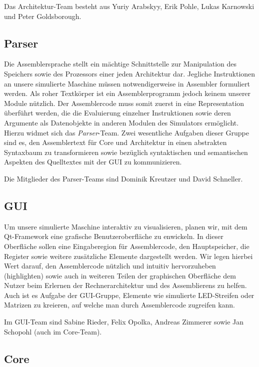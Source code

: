 Das Architektur-Team besteht aus Yuriy Arabskyy, Erik Pohle, Lukas Karnowski und
Peter Goldsborough.

\subsection{Parser}

Die Assemblersprache stellt ein mächtige Schnittstelle zur Manipulation des
Speichers sowie des Prozessors einer jeden Architektur dar. Jegliche
Instruktionen an unsere simulierte Maschine müssen notwendigerweise in Assembler
formuliert werden. Als roher Textkörper ist ein Assemblerprogramm jedoch keinem
unserer Module nützlich. Der Assemblercode muss somit zuerst in eine
Representation überführt werden, die die Evaluierung einzelner Instruktionen
sowie deren Argumente als Datenobjekte in anderen Modulen des Simulators
ermöglicht. Hierzu widmet sich das \emph{Parser}-Team. Zwei wesentliche Aufgaben
dieser Gruppe sind es, den Assemblertext für Core und Architektur in einen
abstrakten Syntaxbaum zu transformieren sowie bezüglich syntaktischen und
semantischen Aspekten des Quelltextes mit der GUI zu kommunizieren.

Die Mitglieder des Parser-Teams sind Dominik Kreutzer und David Schneller.

\subsection{GUI}

Um unsere simulierte Maschine interaktiv zu visualisieren, planen wir, mit dem
Qt-Framework eine grafische Benutzeroberfläche zu enwickeln. In dieser
Oberfläche sollen eine Eingaberegion für Assemblercode, den Hauptspeicher, die
Register sowie weitere zusätzliche Elemente dargestellt werden. Wir legen
hierbei Wert darauf, den Assemblercode nützlich und intuitiv hervorzuheben
(highlighten) sowie auch in weiteren Teilen der graphischen Oberfläche dem
Nutzer beim Erlernen der Rechnerarchitektur und des Assemblierens zu
helfen. Auch ist es Aufgabe der GUI-Gruppe, Elemente wie simulierte LED-Streifen
oder Matrizen zu kreieren, auf welche man durch Assemblercode zugreifen
kann.

Im GUI-Team sind Sabine Rieder, Felix Opolka, Andreas Zimmerer sowie Jan
Schopohl (auch im Core-Team).

\subsection{Core}

